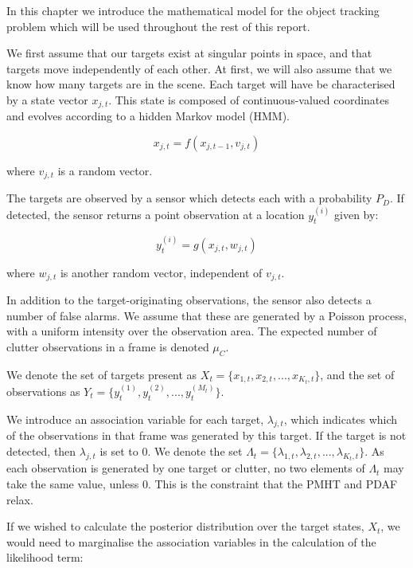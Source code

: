 In this chapter we introduce the mathematical model for the object tracking problem which will be used throughout the rest of this report.

We first assume that our targets exist at singular points in space, and that targets move independently of each other. At first, we will also assume that we know how many targets are in the scene. Each target will have be characterised by a state vector $x_{j,t}$. This state is composed of continuous-valued coordinates and evolves according to a hidden Markov model (HMM).

\begin{equation}
x_{j,t} = f(x_{j,t-1}, v_{j,t})
\end{equation}

where $v_{j,t}$ is a random vector.

The targets are observed by a sensor which detects each with a probability $P_D$. If detected, the sensor returns a point observation at a location $y_t^{(i)}$ given by:

\begin{equation}
y_t^{(i)} = g(x_{j,t}, w_{j,t})
\end{equation}

where $w_{j,t}$ is another random vector, independent of $v_{j,t}$.

In addition to the target-originating observations, the sensor also detects a number of false alarms. We assume that these are generated by a Poisson process, with a uniform intensity over the observation area. The expected number of clutter observations in a frame is denoted $\mu_C$.

We denote the set of targets present as $X_t = \{x_{1,t}, x_{2,t}, ... , x_{K_t, t} \}$, and the set of observations as $Y_t = \{y_t^{(1)}, y_t^{(2)}, ... , y_t^{(M_t)} \}$.

We introduce an association variable for each target, $\lambda_{j,t}$, which indicates which of the observations in that frame was generated by this target. If the target is not detected, then $\lambda_{j,t}$ is set to 0. We denote the set $\Lambda_t = \{\lambda_{1,t}, \lambda_{2,t}, ... , \lambda_{K_t, t} \}$. As each observation is generated by one target or clutter, no two elements of $\Lambda_t$ may take the same value, unless 0. This is the constraint that the PMHT and PDAF relax.

If we wished to calculate the posterior distribution over the target states, $X_t$, we would need to marginalise the association variables in the calculation of the likelihood term:

